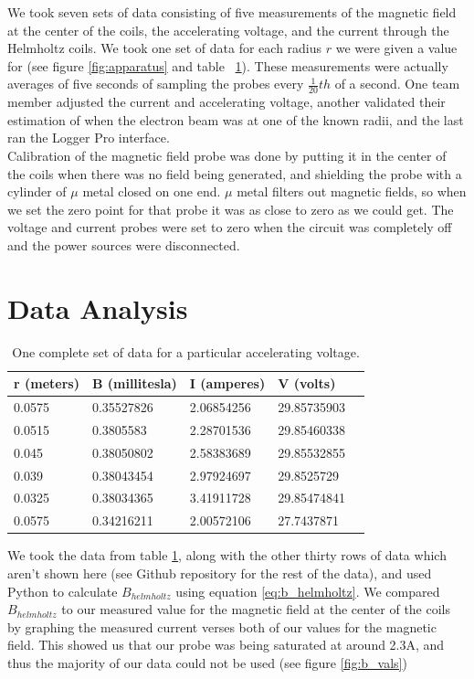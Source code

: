 \documentclass[aps,twocolumn,secnumarabic,amsmath,amssymb,nofootinbib]{revtex4-1}
\begin{document}
We took seven sets of data consisting of five measurements of the magnetic field at the center of the coils, the accelerating voltage, and the current through the Helmholtz coils. We took one set of data for each radius $r$ we were given a value for (see figure \ref{fig:apparatus} and table ~\ref{tab:data}). These measurements were actually averages of five seconds of sampling the probes every $\frac{1}{20}th$ of a second. One team member adjusted the current and accelerating voltage, another validated their estimation of when the electron beam was at one of the known radii, and the last ran the Logger Pro interface. \\

Calibration of the magnetic field probe was done by putting it in the center of the coils when there was no field being generated, and shielding the probe with a cylinder of $\mu$ metal closed on one end. $\mu$ metal filters out magnetic fields, so when we set the zero point for that probe it was as close to zero as we could get. The voltage and current probes were set to zero when the circuit was completely off and the power sources were disconnected.

\section{Data Analysis}

\begin{table}[ht]
\centering
\caption{One complete set of data for a particular accelerating voltage.}
\label{tab:data}
\begin{tabular}{lllll}
r (meters) & B (millitesla) & I (amperes) & V (volts)   &  \\ \hline
0.0575     & 0.35527826     & 2.06854256  & 29.85735903 &  \\
0.0515     & 0.3805583      & 2.28701536  & 29.85460338 &  \\
0.045      & 0.38050802     & 2.58383689  & 29.85532855 &  \\
0.039      & 0.38043454     & 2.97924697  & 29.8525729  &  \\
0.0325     & 0.38034365     & 3.41911728  & 29.85474841 &  \\
0.0575     & 0.34216211     & 2.00572106  & 27.7437871  & \\
\hline
\end{tabular}
\end{table}

We took the data from table \ref{tab:data}, along with the other thirty rows of data which aren't shown here (see Github repository \cite{github} for the rest of the data), and used Python to calculate $B_{helmholtz}$ using equation \ref{eq:b_helmholtz}. We compared $B_{helmholtz}$ to our measured value for the magnetic field at the center of the coils by graphing the measured current verses both of our values for the magnetic field.  This showed us that our probe was being saturated at around 2.3A, and thus the majority of our data could not be used (see figure \ref{fig:b_vals})
\end{document}
